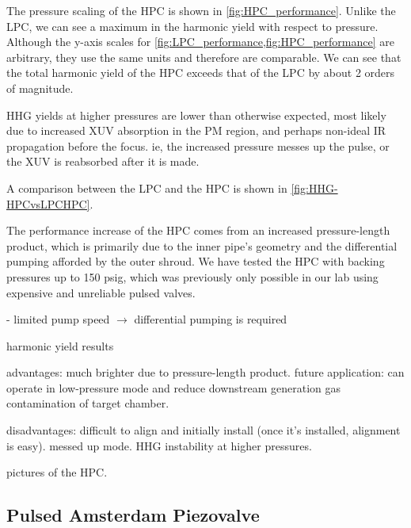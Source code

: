 The pressure scaling of the HPC is shown in \cref{fig:HPC_performance}. Unlike the LPC, we can see a maximum in the harmonic yield with respect to pressure. Although the y-axis scales for \cref{fig:LPC_performance,fig:HPC_performance} are arbitrary, they use the same units and therefore are comparable. We can see that the total harmonic yield of the HPC exceeds that of the LPC by about 2 orders of magnitude.

HHG yields at higher pressures are lower than otherwise expected, most likely due to increased XUV absorption in the PM region, and perhaps non-ideal IR propagation before the focus. ie, the increased pressure messes up the pulse, or the XUV is reabsorbed after it is made.

A comparison between the LPC and the HPC is shown in \cref{fig:HHG-HPCvsLPCHPC}.

The performance increase of the HPC comes from an increased pressure-length product, which is primarily due to the inner pipe's geometry and the differential pumping afforded by the outer shroud. We have tested the HPC with backing pressures up to 150 psig, which was previously only possible in our lab using expensive and unreliable pulsed valves.


- limited pump speed $\rightarrow$ differential pumping is required


harmonic yield results

advantages: much brighter due to pressure-length product. future application: can operate in low-pressure mode and reduce downstream generation gas contamination of target chamber.

disadvantages: difficult to align and initially install (once it's installed, alignment is easy). messed up mode. HHG instability at higher pressures.

pictures of the HPC.



\subsection{Pulsed Amsterdam Piezovalve}

